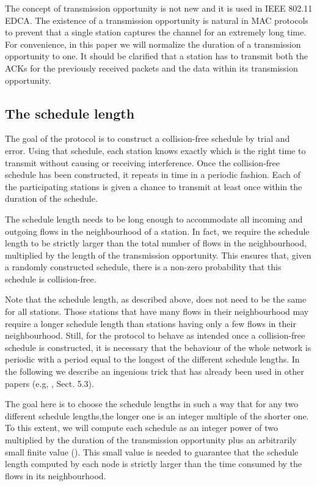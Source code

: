 \documentclass[twocolumn]{svjour3}          \smartqed  \usepackage{graphicx}
\begin{document}
The concept of transmission opportunity is not new and it is used in IEEE 802.11 EDCA.
The existence of a transmission opportunity is natural in MAC protocols to prevent that a single station captures the channel for an extremely long time.
For convenience, in this paper we will normalize the duration of a transmission opportunity to one.
It should be clarified that a station has to transmit both the ACKs for the previously received packets and the data within its transmission opportunity.



\subsection{The schedule length}

The goal of the protocol is to construct a collision-free schedule by trial and error.
Using that schedule, each station knows exactly which is the right time to transmit without causing or receiving interference.
Once the collision-free schedule has been constructed, it repeats in time in a periodic fashion.
Each of the participating stations is given a chance to transmit at least once within the duration of the schedule.

The schedule length needs to be long enough to accommodate all incoming and outgoing flows in the neighbourhood of a station.
In fact, we require the schedule length to be strictly larger than the total number of flows in the neighbourhood, multiplied by the length of the transmission opportunity.
This ensures that, given a randomly constructed schedule, there is a non-zero probability that this schedule is collision-free.

Note that the schedule length, as described above, does not need to be the same for all stations.
Those stations that have many flows in their neighbourhood may require a longer schedule length than stations having only a few flows in their neighbourhood.
Still, for the protocol to behave as intended once a collision-free schedule is constructed, it is necessary that the behaviour of the whole network is periodic with a period equal to the longest of the different schedule lengths.
In the following we describe an ingenious trick that has already been used in other papers (e.g, \cite{fang2010dlm}, Sect. 5.3).

The goal here is to choose the schedule lengths in such a way that for any two different schedule lengths,the longer one is an integer multiple of the shorter one.
To this extent, we will compute each schedule as an integer power of two multiplied by the duration of the transmission opportunity plus an arbitrarily small finite value ().
This small value is needed to guarantee that the schedule length computed by each node is strictly larger than the time consumed by the flows in its neighbourhood.
\end{document}
